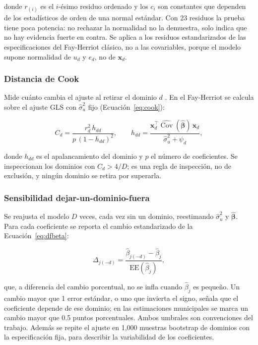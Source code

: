 donde $r_{(i)}$ es el $i$-ésimo residuo ordenado y los $c_i$ son constantes que dependen de los estadísticos de orden de una normal estándar. Con 23 residuos la prueba tiene poca potencia: no rechazar la normalidad no la demuestra, solo indica que no hay evidencia fuerte en contra. Se aplica a los residuos estandarizados de las especificaciones del Fay-Herriot clásico, no a las covariables, porque el modelo supone normalidad de $u_d$ y $e_d$, no de $\mathbf{x}_d$.

\subsubsection{Distancia de Cook}

Mide cuánto cambia el ajuste al retirar el dominio $d$ \cite{Cook1977}. En el Fay-Herriot se calcula sobre el ajuste GLS con $\hat{\sigma}_u^2$ fijo (Ecuación~\ref{eq:cook}):

\begin{equation}
    C_d = \frac{r_d^2\, h_{dd}}{p\,(1-h_{dd})^2}, \qquad h_{dd} = \frac{\mathbf{x}_d^\top \widehat{\operatorname{Cov}}(\hat{\boldsymbol{\beta}})\,\mathbf{x}_d}{\hat{\sigma}_u^2 + \psi_d},
    \label{eq:cook}
\end{equation}

donde $h_{dd}$ es el apalancamiento del dominio y $p$ el número de coeficientes. Se inspeccionan los dominios con $C_d > 4/D$; es una regla de inspección, no de exclusión, y ningún dominio se retira por superarla.

\subsubsection{Sensibilidad dejar-un-dominio-fuera}

Se reajusta el modelo $D$ veces, cada vez sin un dominio, reestimando $\hat{\sigma}_u^2$ y $\hat{\boldsymbol{\beta}}$. Para cada coeficiente se reporta el cambio estandarizado de la Ecuación~\ref{eq:dfbeta}:

\begin{equation}
    \Delta_{j(-d)} = \frac{\hat{\beta}_{j(-d)} - \hat{\beta}_j}{\text{EE}(\hat{\beta}_j)},
    \label{eq:dfbeta}
\end{equation}

que, a diferencia del cambio porcentual, no se infla cuando $\hat{\beta}_j$ es pequeño. Un cambio mayor que 1 error estándar, o uno que invierta el signo, señala que el coeficiente depende de ese dominio; en las estimaciones municipales se marca un cambio mayor que 0.5 puntos porcentuales. Ambos umbrales son convenciones del trabajo. Además se repite el ajuste en 1,000 muestras bootstrap de dominios con la especificación fija, para describir la variabilidad de los coeficientes.

